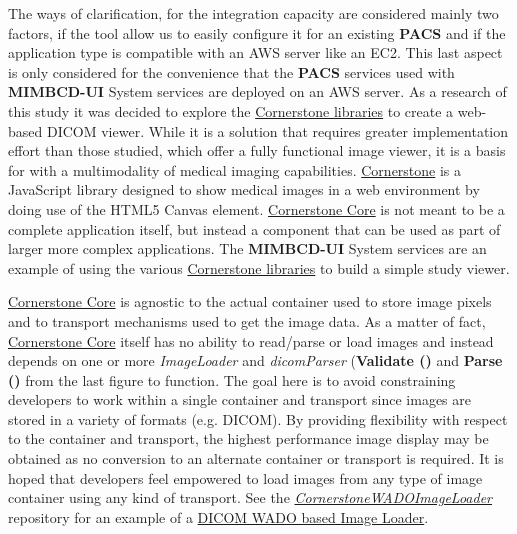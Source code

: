 \documentclass{tufte-book} %
\begin{document}

The ways of clarification, for the integration capacity are considered mainly two factors, if the tool allow us to easily configure it for an existing \textbf{PACS} and if the application type is compatible with an AWS server like an EC2. This last aspect is only considered for the convenience that the \textbf{PACS} services used with \textbf{MIMBCD-UI} System services are deployed on an AWS server. As a research of this study it was decided to explore the \href{https://github.com/cornerstonejs}{Cornerstone libraries} to create a web-based DICOM viewer. While it is a solution that requires greater implementation effort than those studied, which offer a fully functional image viewer, it is a basis for with a multimodality of medical imaging capabilities. \href{https://github.com/cornerstonejs}{Cornerstone} is a JavaScript library designed to show medical images in a web environment by doing use of the HTML5 Canvas element. \href{https://github.com/cornerstonejs/cornerstone}{Cornerstone Core} is not meant to be a complete application itself, but instead a component that can be used as part of larger more complex applications. The \textbf{MIMBCD-UI} System services are an example of using the various \href{https://github.com/cornerstonejs}{Cornerstone libraries} to build a simple study viewer.

\clearpage

\href{https://github.com/cornerstonejs/cornerstone}{Cornerstone Core} is agnostic to the actual container used to store image pixels and to transport mechanisms used to get the image data. As a matter of fact, \href{https://github.com/cornerstonejs/cornerstone}{Cornerstone Core} itself has no ability to read/parse or load images and instead depends on one or more \textit{ImageLoader} and \textit{dicomParser} (\textbf{Validate ()} and \textbf{Parse ()} from the last figure to function. The goal here is to avoid constraining developers to work within a single container and transport since images are stored in a variety of formats (e.g. DICOM). By providing flexibility with respect to the container and transport, the highest performance image display may be obtained as no conversion to an alternate container or transport is required. It is hoped that developers feel empowered to load images from any type of image container using any kind of transport. See the \href{https://github.com/cornerstonejs/cornerstoneWADOImageLoader}{\textit{CornerstoneWADOImageLoader}} repository for an example of a \href{https://github.com/cornerstonejs/cornerstone/wiki/ImageLoader}{DICOM WADO based Image Loader}.
\end{document}
